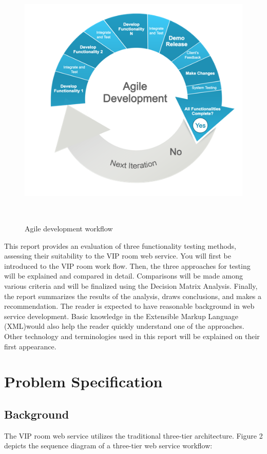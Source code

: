 \documentclass[12pt]{article}
\begin{document}
\begin{figure}[ht!]
\centering
\includegraphics[width=12.5cm,height=12.5cm,keepaspectratio]{img/agile.png}
\caption{Agile development workflow}
\label{overflow}
\end{figure}

This report provides an evaluation of three functionality testing methods, assessing their 
suitability to the VIP room web service. You will first be introduced to the VIP room work flow. Then, the three approaches for testing will be explained and compared in detail. Comparisons will be made among various criteria and will be finalized using the Decision Matrix Analysis. Finally, the report summarizes the results of the analysis, draws 
conclusions, and makes a recommendation. The reader is expected to have reasonable background in web service development. Basic knowledge in the Extensible Markup Language (XML)would also help the reader quickly understand one of the approaches. Other technology and terminologies used in this report will be explained on their first appearance.\\



\newpage

\section{Problem Specification}
\subsection{Background}
The VIP room web service utilizes the traditional three-tier architecture. Figure 2 depicts the sequence diagram of a three-tier web service workflow:
\end{document}
